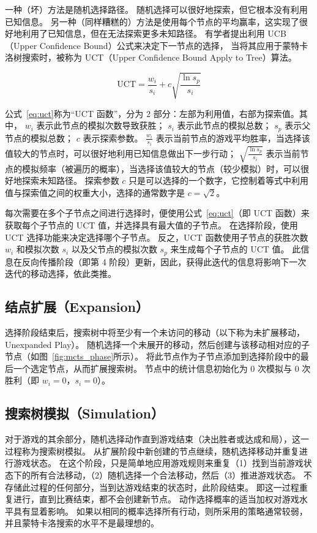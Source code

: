 \documentclass[UTF8,cs4size]{ctexart}
\begin{document}
一种（坏）方法是随机选择路径。 随机选择可以很好地探索，但它根本没有利用已知信息。
另一种（同样糟糕的）方法是使用每个节点的平均赢率，这实现了很好地利用了已知信息，但在无法探索更多未知路径。
有学者提出利用 UCB（Upper Confidence Bound）公式来决定下一节点的选择\cite{DBLP:conf/ecml/KocsisS06}，
当将其应用于蒙特卡洛树搜索时，被称为 UCT（Upper Confidence Bound Apply to Tree）算法。

\begin{equation}
  \text{UCT} = \frac{w_i}{s_i} + c\sqrt{\frac{\ln{s_p}}{s_i}}
  \label{eq:uct}
\end{equation}

公式~\eqref{eq:uct}称为“UCT 函数”，分为 2 部分：左部为利用值，右部为探索值。其中，
$w_i$ 表示此节点的模拟次数导致获胜；
$s_i$ 表示此节点的模拟总数；
$s_p$ 表示父节点的模拟总数；
$c$ 表示探索参数。
$\frac{w_i}{s_i}$ 表示当前节点的游戏平均胜率，当选择该值较大的节点时，可以很好地利用已知信息做出下一步行动；
$\sqrt{\frac{\ln{s_p}}{s_i}}$ 表示当前节点的模拟频率（被遍历的概率），当选择该值较大的节点（较少模拟）时，可以很好地探索未知路径。
探索参数 $c$ 只是可以选择的一个数字，它控制着等式中利用值与探索值之间的权重大小，选择的通常数字是 $c = \sqrt{2}$。

每次需要在多个子节点之间进行选择时，便使用公式~\eqref{eq:uct}（即 UCT 函数）来获取每个子节点的 UCT 值，并选择具有最大值的子节点。
在选择阶段，使用 UCT 选择功能来决定选择哪个子节点。
反之，UCT 函数使用子节点的获胜次数 $w_i$ 和模拟次数 $s_i$ 以及父节点的模拟次数 $s_p$ 来生成每个子节点的 UCT 值。
此信息在反向传播阶段（即第 4 阶段）更新，因此，获得此迭代的信息将影响下一次迭代的移动选择，依此类推。

\subsection{结点扩展（Expansion）}
选择阶段结束后，搜索树中将至少有一个未访问的移动（以下称为未扩展移动，Unexpanded Play）。
随机选择一个未展开的移动，然后创建与该移动相对应的子节点（如图~\ref{fig:mcts_phase}所示）。
将此节点作为子节点添加到选择阶段中的最后一个选定节点，从而扩展搜索树。
节点中的统计信息初始化为 0 次模拟与 0 次胜利（即 $w_i = 0$，$s_i = 0$）。

\subsection{搜索树模拟（Simulation）}
对于游戏的其余部分，随机选择动作直到游戏结束（决出胜者或达成和局），这一过程称为搜索树模拟。
从扩展阶段中新创建的节点继续，随机选择移动并重复进行游戏状态。
在这个阶段，只是简单地应用游戏规则来重复（1）找到当前游戏状态下的所有合法移动，（2）随机选择一个合法移动，然后（3）推进游戏状态。
不存储此过程的任何部分，当到达游戏结束的状态时，此阶段结束。
即这一过程重复进行，直到比赛结束，都不会创建新节点。
动作选择概率的适当加权对游戏水平具有显着影响。
如果以相同的概率选择所有行动，则所采用的策略通常较弱，并且蒙特卡洛搜索的水平不是最理想的。
\end{document}

